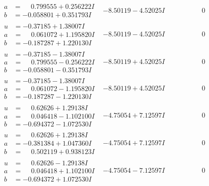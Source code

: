 \documentclass[1p]{elsarticle_modified}
\theoremstyle{definition}
\begin{document}
$$\begin{array}{c|c|c}
\begin{aligned}
a &= \phantom{-}0.799555 + 0.256222 I \\
b &= -0.058801 + 0.351793 I\end{aligned}
 & -8.50119 - 4.52025 I & \phantom{-0.000000 } 0 \\ \hline\begin{aligned}
u &= -0.37185 + 1.38007 I \\
a &= \phantom{-}0.061072 + 1.195820 I \\
b &= -0.187287 + 1.220130 I\end{aligned}
 & -8.50119 - 4.52025 I & \phantom{-0.000000 } 0 \\ \hline\begin{aligned}
u &= -0.37185 - 1.38007 I \\
a &= \phantom{-}0.799555 - 0.256222 I \\
b &= -0.058801 - 0.351793 I\end{aligned}
 & -8.50119 + 4.52025 I & \phantom{-0.000000 } 0 \\ \hline\begin{aligned}
u &= -0.37185 - 1.38007 I \\
a &= \phantom{-}0.061072 - 1.195820 I \\
b &= -0.187287 - 1.220130 I\end{aligned}
 & -8.50119 + 4.52025 I & \phantom{-0.000000 } 0 \\ \hline\begin{aligned}
u &= \phantom{-}0.62626 + 1.29138 I \\
a &= \phantom{-}0.046418 - 1.102100 I \\
b &= -0.694372 - 1.072530 I\end{aligned}
 & -4.75054 + 7.12597 I & \phantom{-0.000000 } 0 \\ \hline\begin{aligned}
u &= \phantom{-}0.62626 + 1.29138 I \\
a &= -0.381384 + 1.047360 I \\
b &= \phantom{-}0.502119 + 0.938123 I\end{aligned}
 & -4.75054 + 7.12597 I & \phantom{-0.000000 } 0 \\ \hline\begin{aligned}
u &= \phantom{-}0.62626 - 1.29138 I \\
a &= \phantom{-}0.046418 + 1.102100 I \\
b &= -0.694372 + 1.072530 I\end{aligned}
 & -4.75054 - 7.12597 I & \phantom{-0.000000 } 0 \\ \hline\begin{aligned}

\end{aligned}
\end{array}$$
\end{document}
